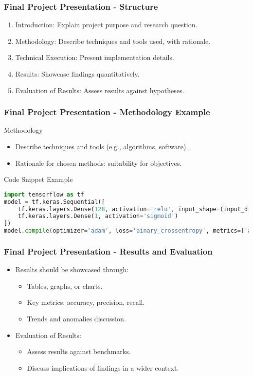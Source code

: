\documentclass[aspectratio=169]{beamer}
\begin{document}
\begin{frame}[fragile]
    \frametitle{Final Project Presentation - Structure}
    \begin{enumerate}
        \item Introduction: Explain project purpose and research question.
        \item Methodology: Describe techniques and tools used, with rationale.
        \item Technical Execution: Present implementation details.
        \item Results: Showcase findings quantitatively.
        \item Evaluation of Results: Assess results against hypotheses.
    \end{enumerate}
\end{frame}

\begin{frame}[fragile]
    \frametitle{Final Project Presentation - Methodology Example}
    \begin{block}{Methodology}
        \begin{itemize}
            \item Describe techniques and tools (e.g., algorithms, software).
            \item Rationale for chosen methods: suitability for objectives.
        \end{itemize}
    \end{block}
    \begin{block}{Code Snippet Example}
        \begin{lstlisting}[language=Python]
import tensorflow as tf
model = tf.keras.Sequential([
    tf.keras.layers.Dense(128, activation='relu', input_shape=(input_dim,)),
    tf.keras.layers.Dense(1, activation='sigmoid')
])
model.compile(optimizer='adam', loss='binary_crossentropy', metrics=['accuracy'])
        \end{lstlisting}
    \end{block}
\end{frame}

\begin{frame}[fragile]
    \frametitle{Final Project Presentation - Results and Evaluation}
    \begin{itemize}
        \item Results should be showcased through:
        \begin{itemize}
            \item Tables, graphs, or charts.
            \item Key metrics: accuracy, precision, recall.
            \item Trends and anomalies discussion.
        \end{itemize}
        \item Evaluation of Results:
        \begin{itemize}
            \item Assess results against benchmarks.
            \item Discuss implications of findings in a wider context.
        \end{itemize}
    \end{itemize}
\end{frame}
\end{document}
